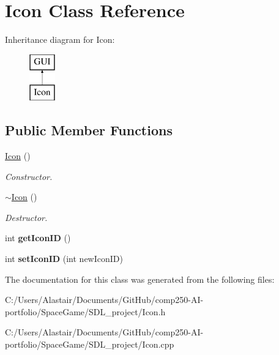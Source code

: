 \hypertarget{class_icon}{}\section{Icon Class Reference}
\label{class_icon}
Inheritance diagram for Icon\+:\begin{figure}[H]
\begin{center}
\leavevmode
\includegraphics[height=2.000000cm]{class_icon}
\end{center}
\end{figure}
\subsection*{Public Member Functions}
\begin{DoxyCompactItemize}
\item 
\mbox{\label{class_icon_a2c06009b9034912dea464e9f3c3791f9}} 
\hyperlink{class_icon_a2c06009b9034912dea464e9f3c3791f9}{Icon} ()
\begin{DoxyCompactList}\small\item\em Constructor. \end{DoxyCompactList}\item 
\mbox{\label{class_icon_adb1b98ed12cd965ce849667c751e10c2}} 
\hyperlink{class_icon_adb1b98ed12cd965ce849667c751e10c2}{$\sim$\+Icon} ()
\begin{DoxyCompactList}\small\item\em Destructor. \end{DoxyCompactList}\item 
\mbox{\label{class_icon_a33eff58279320449d77be043be5625b1}} 
int {\bfseries get\+Icon\+ID} ()
\item 
\mbox{\label{class_icon_a278887be01cbb69175cb58f9ecf69894}} 
int {\bfseries set\+Icon\+ID} (int new\+Icon\+ID)
\end{DoxyCompactItemize}


The documentation for this class was generated from the following files\+:\begin{DoxyCompactItemize}
\item 
C\+:/\+Users/\+Alastair/\+Documents/\+Git\+Hub/comp250-\/\+A\+I-\/portfolio/\+Space\+Game/\+S\+D\+L\+\_\+project/Icon.\+h\item 
C\+:/\+Users/\+Alastair/\+Documents/\+Git\+Hub/comp250-\/\+A\+I-\/portfolio/\+Space\+Game/\+S\+D\+L\+\_\+project/Icon.\+cpp\end{DoxyCompactItemize}

